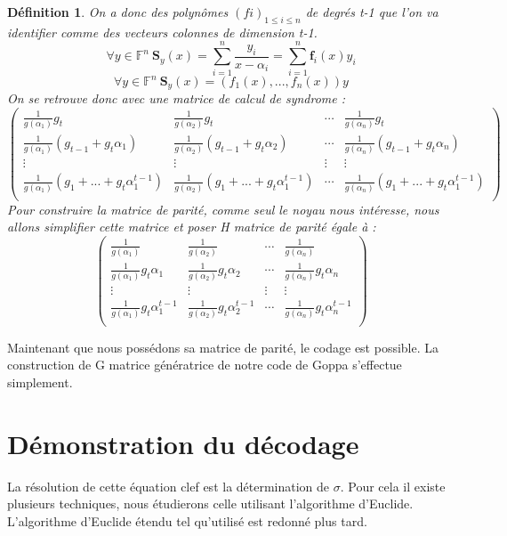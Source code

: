 \documentclass{article}
\newtheorem{defi}{Définition}
\begin{document}
		\begin{defi}
			On a donc des polynômes $(fi)_{1\leq i \leq n}$ de degrés t-1 que l'on va identifier comme des vecteurs colonnes de dimension t-1.
			$$ \forall y \in \mathbb{F}^{n} \ \mathbf{S}_{y}(x) = \sum_{i=1}^{n} \frac{y_{i}}{x-\alpha_{i}} = \sum_{i=1}^{n} \mathbf{f}_{i}(x)y_{i}$$
			$$ \forall y \in \mathbb{F}^{n} \  \mathbf{S}_{y}(x) =(f_{1}(x), ... , f_{n}(x))y $$
			On se retrouve donc avec une matrice de calcul de syndrome :
			$$ 
			\begin{pmatrix}
				\frac{1}{g(\alpha_{1})}g_{t} &  \frac{1}{g(\alpha_{2})}g_{t} & \cdots &  \frac{1}{g(\alpha_{n})}g_{t} \\
				\frac{1}{g(\alpha_{1})}(g_{t-1} + g_{t}\alpha_{1}) &  \frac{1}{g(\alpha_{2})}(g_{t-1} + g_{t}\alpha_{2}) & \cdots &  \frac{1}{g(\alpha_{n})}(g_{t-1} + g_{t}\alpha_{n}) \\
				\vdots & \vdots & \vdots & \vdots\\
				\frac{1}{g(\alpha_{1})}(g_{1} + ... +g_{t}\alpha_{1}^{t-1}) &  \frac{1}{g(\alpha_{2})}(g_{1} + ... +g_{t}\alpha_{1}^{t-1}) & \cdots &  \frac{1}{g(\alpha_{n})}(g_{1} + ... +g_{t}\alpha_{1}^{t-1}) \\
			\end{pmatrix}
			$$
			Pour construire la matrice de parité, comme seul le noyau nous intéresse, nous allons simplifier cette matrice et poser H matrice de parité égale à :
			$$
			\begin{pmatrix}
				\frac{1}{g(\alpha_{1})} &  \frac{1}{g(\alpha_{2})} & \cdots &  \frac{1}{g(\alpha_{n})} \\
				\frac{1}{g(\alpha_{1})}g_{t}\alpha_{1} &  \frac{1}{g(\alpha_{2})}g_{t}\alpha_{2} & \cdots &  \frac{1}{g(\alpha_{n})}g_{t}\alpha_{n}\\
				\vdots & \vdots & \vdots & \vdots\\
				\frac{1}{g(\alpha_{1})}g_{t}\alpha_{1}^{t-1} &  \frac{1}{g(\alpha_{2})}g_{t}\alpha_{2}^{t-1} & \cdots &  \frac{1}{g(\alpha_{n})}g_{t}\alpha_{n}^{t-1} \\
			\end{pmatrix}
			$$
		\end{defi}

		Maintenant que nous possédons sa matrice de parité, le codage est possible. 
		La construction de G matrice génératrice de notre code de Goppa s'effectue simplement.

	\section{Démonstration du décodage}
		\label{eqclef}
		La résolution de cette équation clef est la détermination de $\sigma$.
		Pour cela il existe plusieurs techniques, nous étudierons celle utilisant l'algorithme d'Euclide.
		L'algorithme d'Euclide étendu tel qu'utilisé est redonné plus tard.
\end{document}
